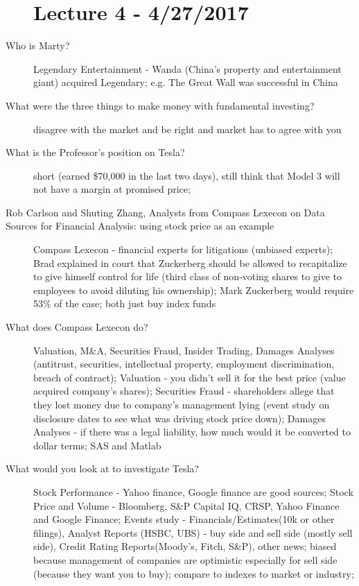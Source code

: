 \documentclass[11pt]{article}
\begin{document}
\begin{description}
\section{Lecture 4 - 4/27/2017}
\item[Who is Marty?]
  Legendary Entertainment - Wanda (China's property and entertainment giant) acquired Legendary;
  e.g. The Great Wall was successful in China
\item[What were the three things to make money with fundamental investing?]
  disagree with the market and be right and market has to agree with you
\item[What is the Professor's position on Tesla?]
  short (earned \$70,000 in the last two days), still think that Model 3 will not have a margin at promised price;
\item[Rob Carlson and Shuting Zhang, Analysts from Compass Lexecon on Data Sources for Financial Analysis: using stock price as an example]
  Compass Lexecon - financial experts for litigations (unbiased experts);
  Brad explained in court that Zuckerberg should be allowed to recapitalize to give himself control for life (third class of non-voting shares to give to employees to avoid diluting his ownership);
  Mark Zuckerberg would require 53\% of the case;
  both just buy index funds
\item[What does Compass Lexecon do?]
  Valuation, M\&A, Securities Fraud, Insider Trading, Damages Analyses (antitrust, securities, intellectual property, employment discrimination, breach of contract);
  Valuation - you didn't sell it for the best price (value acquired company's shares);
  Securities Fraud - shareholders allege that they lost money due to company's management lying (event study on disclosure dates to see what was driving stock price down);
  Damages Analyses - if there was a legal liability, how much would it be converted to dollar terms;
  SAS and Matlab
\item[What would you look at to investigate Tesla?]
  Stock Performance - Yahoo finance, Google finance are good sources;
  Stock Price and Volume - Bloomberg, S\&P Capital IQ, CRSP, Yahoo Finance and Google Finance;
  Events study - Financials/Estimates(10k or other filings), Analyst Reports (HSBC, UBS) - buy side and sell side (mostly sell side),
  Credit Rating Reports(Moody's, Fitch, S\&P), other news;
  biased because management of companies are optimistic especially for sell side (because they want you to buy);
  compare to indexes to market or industry;

\end{description}
\end{document}
